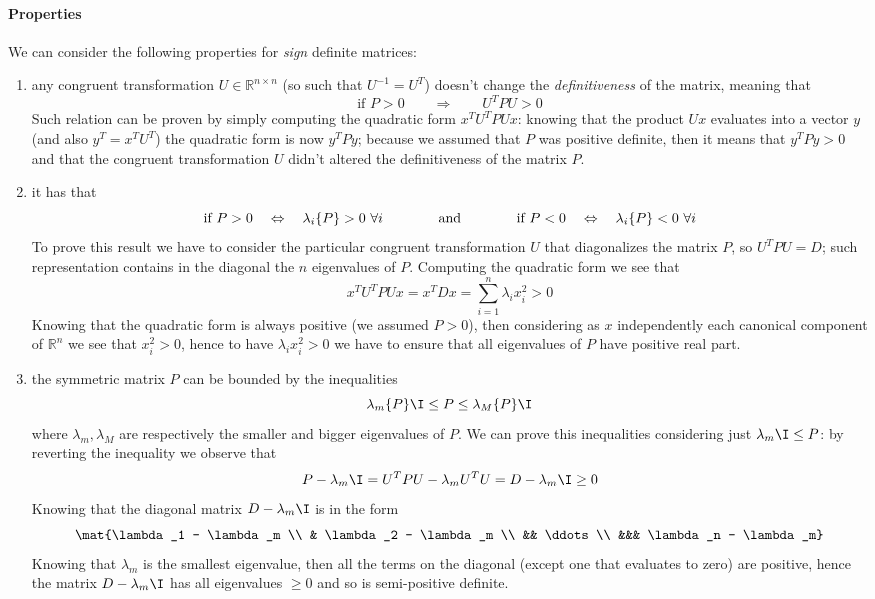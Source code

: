 	\paragraph{Properties} We can consider the following properties for \textit{sign} definite matrices:
	\begin{enumerate}[ \itshape i)]
		\item any congruent transformation $U \in \mathds R^{n\times n}$ (so such that $U^{-1} = U^T$) doesn't change the \textit{definitiveness} of the matrix, meaning that 
		\[ \textrm{if } P > 0 \qquad \Rightarrow \qquad U^T P U > 0 \]
		Such relation can be proven by simply computing the quadratic form $x^TU^TPUx$: knowing that the product $Ux$ evaluates into a vector $y$ (and also $y^T = x^TU^T$) the quadratic form is now $y^TPy$; because we assumed that $P$ was positive definite, then it means that $y^TPy > 0$ and that the congruent transformation $U$ didn't altered the definitiveness of the matrix $P$.
		
		\item it has that
		\[ \textrm{if } P > 0 \quad \Leftrightarrow \quad \lambda_i \{P\} > 0 \ \forall i \hspace{1.4cm} \textrm{and} \hspace{1.4cm} \textrm{if } P < 0 \quad \Leftrightarrow \quad \lambda_i \{P\} < 0 \ \forall i \]
		To prove this result we have to consider the particular congruent transformation $U$ that diagonalizes the matrix $P$, so $U^TPU = D$; such representation contains in the diagonal the $n$ eigenvalues of $P$. Computing the quadratic form we see that
		\[ x^T U^T P U x = x^T D x = \sum_{i=1}^{n} \lambda_i x_i^2 > 0 \]
		Knowing that the quadratic form is always positive (we assumed $P > 0$), then considering as $x$ independently each canonical component of $\mathds R^n$ we  see that $x_i^2 > 0$, hence to have $\lambda_i x_i^2 > 0$ we have to ensure that all eigenvalues of $P$ have positive real part.
		
		\item the symmetric matrix $P$ can be bounded by the inequalities
		\[ \lambda_m\{P\} \I \leq P \leq \lambda_M\{P\} \I \]
		where $\lambda_m,\lambda_M$ are respectively the smaller and bigger eigenvalues of $P$. We can prove this inequalities considering just $\lambda_m \I \leq P$: by reverting the inequality we observe that
		\[ P - \lambda_m \I = U^TPU - \lambda_m U^T U = D - \lambda_m \I \geq 0 \]
		Knowing that the diagonal matrix $D - \lambda_m \I$ is in the form
		\[ \mat{\lambda_1 - \lambda_m \\ & \lambda_2 - \lambda_m \\ && \ddots \\ &&& \lambda_n - \lambda_m} \]
		Knowing that $\lambda_m$ is the smallest eigenvalue, then all the terms on the diagonal (except one that evaluates to zero) are positive, hence the matrix $D- \lambda_m \I$ has all eigenvalues $\geq 0$ and so is semi-positive definite.		
	\end{enumerate}
	
